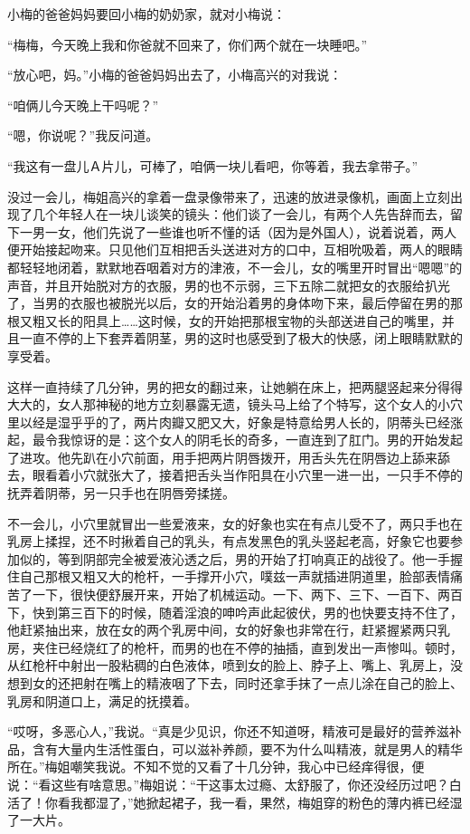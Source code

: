 \documentclass[12pt,UTF8]{ctexbook}
\begin{document}
小梅的爸爸妈妈要回小梅的奶奶家，就对小梅说：

“梅梅，今天晚上我和你爸就不回来了，你们两个就在一块睡吧。”

“放心吧，妈。”小梅的爸爸妈妈出去了，小梅高兴的对我说：

“咱俩儿今天晚上干吗呢？”

“嗯，你说呢？”我反问道。

“我这有一盘儿Ａ片儿，可棒了，咱俩一块儿看吧，你等着，我去拿带子。”

没过一会儿，梅姐高兴的拿着一盘录像带来了，迅速的放进录像机，画面上立刻出现了几个年轻人在一块儿谈笑的镜头：他们谈了一会儿，有两个人先告辞而去，留下一男一女，他们先说了一些谁也听不懂的话（因为是外国人），说着说着，两人便开始接起吻来。只见他们互相把舌头送进对方的口中，互相吮吸着，两人的眼睛都轻轻地闭着，默默地吞咽着对方的津液，不一会儿，女的嘴里开时冒出“嗯嗯”的声音，并且开始脱对方的衣服，男的也不示弱，三下五除二就把女的衣服给扒光了，当男的衣服也被脱光以后，女的开始沿着男的身体吻下来，最后停留在男的那根又粗又长的阳具上……这时候，女的开始把那根宝物的头部送进自己的嘴里，并且一直不停的上下套弄着阴茎，男的这时也感受到了极大的快感，闭上眼睛默默的享受着。

这样一直持续了几分钟，男的把女的翻过来，让她躺在床上，把两腿竖起来分得得大大的，女人那神秘的地方立刻暴露无遗，镜头马上给了个特写，这个女人的小穴里以经是湿乎乎的了，两片肉瓣又肥又大，好象是特意给男人长的，阴蒂头已经涨起，最令我惊讶的是：这个女人的阴毛长的奇多，一直连到了肛门。男的开始发起了进攻。他先趴在小穴前面，用手把两片阴唇拨开，用舌头先在阴唇边上舔来舔去，眼看着小穴就张大了，接着把舌头当作阳具在小穴里一进一出，一只手不停的抚弄着阴蒂，另一只手也在阴唇旁揉搓。

不一会儿，小穴里就冒出一些爱液来，女的好象也实在有点儿受不了，两只手也在乳房上揉捏，还不时揪着自己的乳头，有点发黑色的乳头竖起老高，好象它也要参加似的，等到阴部完全被爱液沁透之后，男的开始了打响真正的战役了。他一手握住自己那根又粗又大的枪杆，一手撑开小穴，噗兹一声就插进阴道里，脸部表情痛苦了一下，很快便舒展开来，开始了机械运动。一下、两下、三下、一百下、两百下，快到第三百下的时候，随着淫浪的呻吟声此起彼伏，男的也快要支持不住了，他赶紧抽出来，放在女的两个乳房中间，女的好象也非常在行，赶紧握紧两只乳房，夹住已经烧红了的枪杆，而男的也在不停的抽插，直到发出一声惨叫。顿时，从红枪杆中射出一股粘稠的白色液体，喷到女的脸上、脖子上、嘴上、乳房上，没想到女的还把射在嘴上的精液咽了下去，同时还拿手抹了一点儿涂在自己的脸上、乳房和阴道口上，满足的抚摸着。

“哎呀，多恶心人，”我说。“真是少见识，你还不知道呀，精液可是最好的营养滋补品，含有大量内生活性蛋白，可以滋补养颜，要不为什么叫精液，就是男人的精华所在。”梅姐嘲笑我说。不知不觉的又看了十几分钟，我心中已经痒得很，便说：“看这些有啥意思。”梅姐说：“干这事太过瘾、太舒服了，你还没经历过吧？白活了！你看我都湿了，”她掀起裙子，我一看，果然，梅姐穿的粉色的薄内裤已经湿了一大片。
\end{document}
